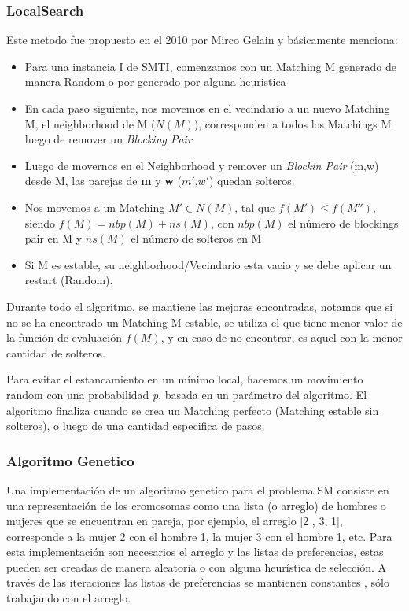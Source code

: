 \documentclass[letter, 10pt]{article}
\begin{document}
\subsubsection{LocalSearch}

Este metodo fue propuesto en el 2010 por Mirco Gelain\cite{Gelain10}  y b\'asicamente menciona:

\begin{itemize}
\item Para una instancia I de SMTI, comenzamos con un Matching M generado de manera Random o por generado por alguna heuristica
\item En cada paso siguiente, nos movemos en el vecindario a un nuevo Matching M, el neighborhood de M ($N(M)$), corresponden a todos los 
Matchings M luego de remover un \textit{Blocking Pair}.
\item Luego de movernos en el Neighborhood y remover un \textit{Blockin Pair} (m,w) desde M, las parejas de \textbf{m} y 
\textbf{w} ($m'$,$w'$) quedan solteros.
\item Nos movemos a un Matching $M' \in N(M)$, tal que $f(M')\leq f(M'')$, siendo $f(M) = nbp(M) + ns(M)$, con $nbp(M)$ el n\'umero 
de blockings pair en M y $ns(M)$  el n\'umero de solteros en M.
\item Si M es estable, su neighborhood/Vecindario esta vacio y se debe aplicar un restart (Random).
\end{itemize}

Durante todo el algoritmo, se mantiene las mejoras encontradas, notamos que si no se ha encontrado un Matching M estable, se utiliza 
el que tiene menor valor de la funci\'on de evaluaci\'on $f(M)$, y en caso de no encontrar, es aquel con la menor cantidad de solteros.

Para evitar el estancamiento en un m\'inimo local, hacemos un movimiento random con una probabilidad \textit{p}, basada en un 
par\'ametro del algoritmo. El algoritmo finaliza cuando se crea un Matching perfecto (Matching estable sin solteros), o luego de una 
cantidad especifica de pasos.

\subsubsection{Algoritmo Genetico}  
	Una implementaci\'on de un algoritmo genetico para el problema SM consiste en una representaci\'on de los cromosomas como una lista
(o arreglo) de hombres o mujeres que se encuentran en pareja, por ejemplo, el arreglo [2 , 3, 1], corresponde a la mujer 2 con el hombre 1, la mujer 3 con el hombre 1, etc.
	Para esta implementaci\'on son necesarios el arreglo y las listas de preferencias, estas pueden ser creadas de manera aleatoria 
o con alguna heur\'istica de selecci\'on. A trav\'es de las iteraciones las listas de preferencias se mantienen constantes , s\'olo trabajando 
con el arreglo. 
\end{document}
